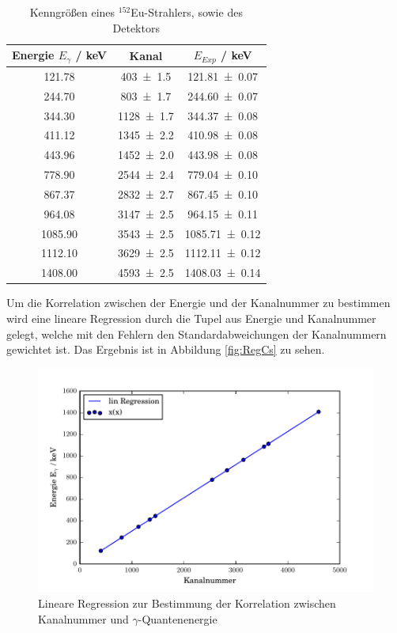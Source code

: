 \begin{table}
  \centering
  \caption{Kenngrößen eines $^{152}$Eu-Strahlers, sowie des Detektors}
  \begin{tabular}{c | c c }
    \toprule
    Energie $E_{\gamma}$ / keV& Kanal & $E_{Exp}$ / keV \\
    \hline
    121.78  & \num{403 +- 1.5}	& \num{121.81 +- 0.07}	\\
    244.70  & \num{803 +- 1.7}  & \num{244.60 +- 0.07}	\\
    344.30  & \num{1128+- 1.7}	& \num{344.37 +- 0.08}	\\
    411.12  & \num{1345+- 2.2}	& \num{410.98 +- 0.08}	\\
    443.96  & \num{1452+- 2.0}	& \num{443.98 +- 0.08}	\\
    778.90  & \num{2544+- 2.4}	& \num{779.04 +- 0.10}	\\
    867.37  & \num{2832+- 2.7}	& \num{867.45 +- 0.10}	\\
    964.08  & \num{3147+- 2.5}	& \num{964.15 +- 0.11}	\\
    1085.90 & \num{3543+- 2.5}	& \num{1085.71 +- 0.12}	\\
    1112.10 & \num{3629+- 2.5}	& \num{1112.11 +- 0.12}	\\
    1408.00 & \num{4593+- 2.5}	& \num{1408.03 +- 0.14}	\\
    \bottomrule
  \end{tabular}
  \label{tab:CsSpekt}
\end{table}

Um die Korrelation zwischen der Energie und der Kanalnummer zu bestimmen wird eine lineare Regression durch die Tupel aus Energie und Kanalnummer gelegt, welche mit den Fehlern den Standardabweichungen der Kanalnummern gewichtet ist. Das Ergebnis ist in Abbildung \ref{fig:RegCs} zu sehen.

\begin{figure}[htpb]
  \centering
  \includegraphics[width=\textwidth]{./build/CsReg.pdf}
  \caption{Lineare Regression zur Bestimmung der Korrelation zwischen Kanalnummer und $\gamma$-Quantenenergie}
  \label{fig:RegEu}
\end{figure}


